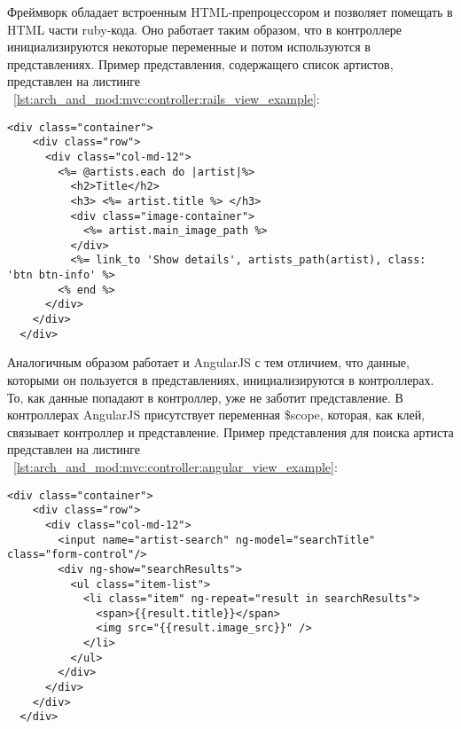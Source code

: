 
Фреймворк \ror{} обладает встроенным HTML-препроцессором и позволяет помещать в HTML части ruby-кода. Оно работает таким образом, что в контроллере инициализируются некоторые переменные и потом используются в представлениях. Пример представления, содержащего список артистов, представлен на листинге ~\ref{lst:arch_and_mod:mvc:controller:rails_view_example}:

\begin{lstlisting}[language=HTML5,caption={Пример получения артистов по определенным параметрам}, label=lst:arch_and_mod:mvc:controller:rails_view_example]
  <div class="container">
    <div class="row">
      <div class="col-md-12">
        <%= @artists.each do |artist|%>
          <h2>Title</h2>
          <h3> <%= artist.title %> </h3>
          <div class="image-container">
            <%= artist.main_image_path %>
          </div>
          <%= link_to 'Show details', artists_path(artist), class: 'btn btn-info' %>
        <% end %>
      </div>
    </div>
  </div>
\end{lstlisting}

Аналогичным образом работает и AngularJS с тем отличием, что данные, которыми он пользуется в представлениях, инициализируются в контроллерах. То, как данные попадают в контроллер, уже не заботит представление. В контроллерах AngularJS присутствует переменная \$scope, которая, как клей, связывает контроллер и представление. Пример представления для поиска артиста представлен на листинге ~\ref{lst:arch_and_mod:mvc:controller:angular_view_example}:

\begin{lstlisting}[language=HTML5,caption={Пример получения артистов по определенным параметрам}, label=lst:arch_and_mod:mvc:controller:angular_view_example]
  <div class="container">
    <div class="row">
      <div class="col-md-12">
        <input name="artist-search" ng-model="searchTitle" class="form-control"/>
        <div ng-show="searchResults">
          <ul class="item-list">
            <li class="item" ng-repeat="result in searchResults">
              <span>{{result.title}}</span>
              <img src="{{result.image_src}}" />
            </li>
          </ul>
        </div>
      </div>
    </div>
  </div>
\end{lstlisting}


